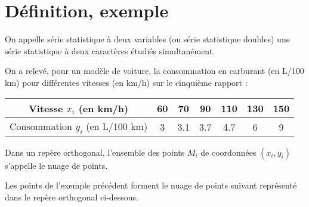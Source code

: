 \documentclass[11pt]{article}
\begin{document}
\section{Définition, exemple}

\begin{definition}
On appelle série statistique à deux variables (ou série statistique doubles) une série statistique à deux caractères étudiés simultanément.
\end{definition}

\begin{exemple}
On a relevé, pour un modèle de voiture, la consommation en carburant (en L/100 km) pour différentes vitesses (en km/h) sur le cinquième rapport :

\begin{center}
\begin{tabular}{|c|c|c|c|c|c|c|}
\hline
Vitesse $x_i$ (en km/h) & 60 & 70 & 90 & 110 & 130 & 150 \\
\hline
Consommation $y_i$ (en L/100 km) & 3 & 3.1 & 3.7 & 4.7 & 6 & 9 \\
\hline
\end{tabular}
\end{center}
\end{exemple}

\begin{definition}
Dans un repère orthogonal, l’ensemble des points $M_i$ de coordonnées $(x_i, y_i)$ s’appelle le nuage de points.
\end{definition}

\begin{exemple}
Les points de l'exemple précédent forment le nuage de points suivant
représenté dans le repère orthogonal ci-dessous.

\begin{center}
\end{center}
\end{exemple}
\end{document}
